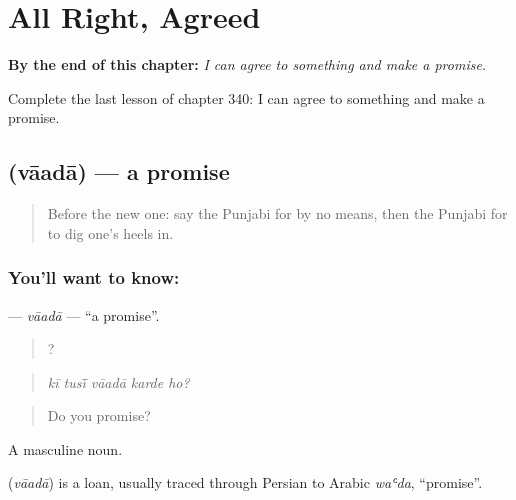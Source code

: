 
\chapter{All Right, Agreed}
\label{ch:pa-a2-all-right-agreed}

\begin{chapteropening}
\textbf{By the end of this chapter:} \emph{I can agree to something and make a promise.}

Complete the last lesson of chapter 340: I can agree to something and make a promise.
\end{chapteropening}

\section[\texorpdfstring{\pa{ਵਾਅਦਾ} (vāadā)}{ਵਾਅਦਾ (vāadā)}]{ (vāadā) — a promise}

\label{lesson:PA-C340-vaada}



\begin{quote}
Before the new one: say the Punjabi for by no means, then the Punjabi for to dig one's heels in.
\end{quote}

\subsection*{You'll want to know: }
\textbf{} — \emph{vāadā} — \textquotedblleft{}a promise\textquotedblright{}.

\begin{quote}
    ?
\end{quote}

\begin{quote}
\emph{kī tusī̃ vāadā karde ho?}
\end{quote}

\begin{quote}
Do you promise?
\end{quote}

A masculine noun.

\begin{cousinweb}
\textbf{} (\emph{vāadā}) is a loan, usually traced through Persian to Arabic \emph{waʿda}, \textquotedblleft{}promise\textquotedblright{}.
\end{cousinweb}

